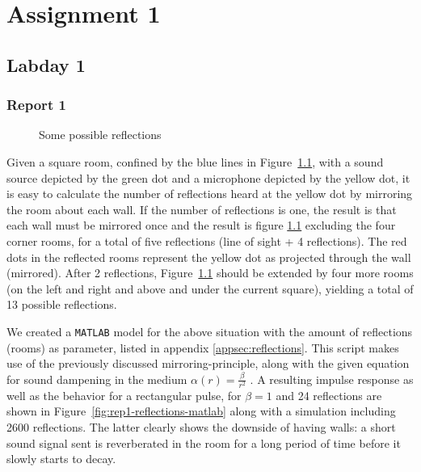 \documentclass[11pt,titlepage]{report}
\begin{document}
\chapter{Assignment 1}
\section{Labday 1}
\subsection{Report 1}

\begin{figure}[H]
	\centering
	
	\caption{Some possible reflections}
	\label{fig:rep1-reflections-ill}
\end{figure}

Given a square room, confined by the blue lines in Figure~\ref{fig:rep1-reflections-ill}, with a sound source depicted by the green dot and a microphone depicted by the yellow dot, it is easy to calculate the number of reflections heard at the yellow dot by mirroring the room about each wall. If the number of reflections is one, the result is that each wall must be mirrored once and the result is figure \ref{fig:rep1-reflections-ill} excluding the four corner rooms, for a total of five reflections (line of sight + 4 reflections). The red dots in the reflected rooms represent the yellow dot as projected through the wall (mirrored). After 2 reflections, Figure~\ref{fig:rep1-reflections-ill} should be extended by four more rooms (on the left and right and above and under the current square), yielding a total of 13 possible reflections.

We created a \texttt{MATLAB} model for the above situation with the amount of reflections (rooms) as parameter, listed in appendix \ref{appsec:reflections}. This script makes use of the previously discussed mirroring-principle, along with the given equation for sound dampening in the medium $\alpha(r) = \frac{\beta}{r^2}$ \cite[91]{epo4-manual}. A resulting impulse response as well as the behavior for a rectangular pulse, for $\beta = 1$ and 24 reflections are shown in Figure~\ref{fig:rep1-reflections-matlab} along with a simulation including 2600 reflections. The latter clearly shows the downside of having walls: a short sound signal sent is reverberated in the room for a long period of time before it slowly starts to decay.
\end{document}
